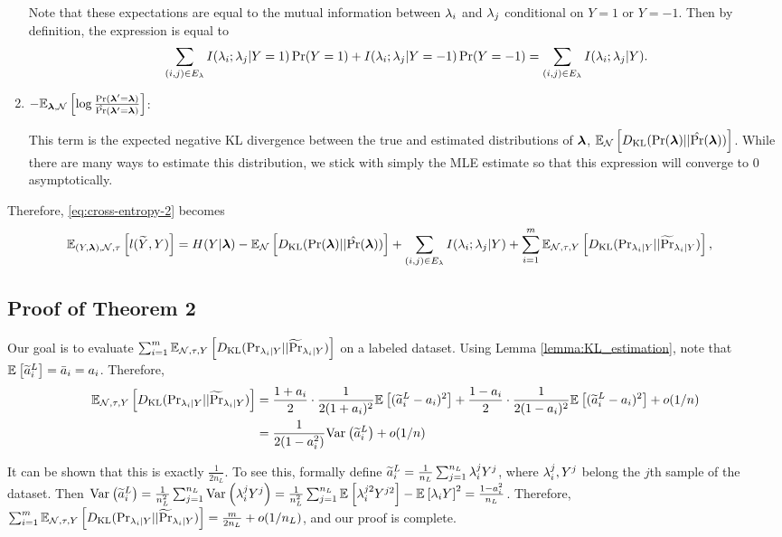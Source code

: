 \begin{enumerate}
    Note that these expectations are equal to the mutual information between $\lambda_i$ and $\lambda_j$ conditional on $Y = 1$ or $Y = -1$. Then by definition, the expression is equal to
    \begin{align*}
    \sum_{(i, j) \in E_{\lambda}} I(\lambda_i; \lambda_j | Y = 1) \Pr(Y = 1) + I(\lambda_i; \lambda_j | Y = -1) \Pr(Y = -1) = \sum_{(i, j) \in E_{\lambda}} I(\lambda_i; \lambda_j | Y).
    \end{align*}


    \item $-\mathbb{E}_{\bm{\lambda}, \mathcal{N}}\left[\log \frac{\Pr(\bm{\lambda}' = \bm{\lambda})}{\hat{\Pr}(\bm{\lambda}' = \bm{\lambda})}\right]$: 
    
    This term is the expected negative KL divergence between the true and estimated distributions of $\bm{\lambda}$, $\mathbb{E}_{\mathcal{N}}\left[D_{\mathrm{KL}}(\Pr(\bm{\lambda}) || \hat{\Pr}(\bm{\lambda}))\right]$. While there are many ways to estimate this distribution, we stick with simply the MLE estimate so that this expression will converge to $0$ asymptotically. 
\end{enumerate}

Therefore, \eqref{eq:cross-entropy-2} becomes
\begin{align}
    \mathbb{E}_{(Y, \bm{\lambda}), \mathcal{N}, \tau}\left[l(\widetilde{Y}, Y)\right] &= H(Y | \bm{\lambda}) - \mathbb{E}_{\mathcal{N}}\left[D_{\mathrm{KL}} (\Pr(\bm{\lambda}) || \hat{\Pr}(\bm{\lambda}))\right] + \sum_{(i, j) \in E_{\lambda}} I(\lambda_i; \lambda_j | Y) + \sum_{i = 1}^m \mathbb{E}_{\mathcal{N}, \tau, Y}\left[D_{\mathrm{KL}} (\mathrm{Pr}_{\lambda_i | Y} || \widetilde{\Pr}_{\lambda_i | Y} )\right], \nonumber 
\end{align}

\subsection{Proof of Theorem 2}

Our goal is to evaluate $\sum_{i = 1}^m \mathbb{E}_{\mathcal{N}, \tau, Y}\left[D_{\mathrm{KL}} (\mathrm{Pr}_{\lambda_i | Y} || \widetilde{\Pr}_{\lambda_i | Y} )\right]$ on a labeled dataset. Using Lemma \ref{lemma:KL_estimation}, note that $\mathbb{E}_{}\left[\widetilde{a}_i^L\right] = \bar{a}_i = a_i$. Therefore,
\begin{align*}
   \mathbb{E}_{\mathcal{N}, \tau, Y}\left[D_{\mathrm{KL}} (\mathrm{Pr}_{\lambda_i | Y} || \widetilde{\Pr}_{\lambda_i | Y} )\right] &= \frac{1 + a_i}{2} \cdot \frac{1}{2(1 + a_i)^2} \mathbb{E}_{}\left[(\widetilde{a}_i^L - a_i)^2\right] + \frac{1 - a_i}{2} \cdot \frac{1}{2(1 - a_i)^2} \mathbb{E}_{}\left[(\widetilde{a}_i^L - a_i)^2\right] + o(1/n) \\
   &=  \frac{1}{2(1 - a_i^2)} \mathrm{Var}_{}\left(\widetilde{a}_i^L\right) + o(1/n)
\end{align*}

It can be shown that this is exactly $\frac{1}{2n_L}$. To see this, formally define $\widetilde{a}_i^L = \frac{1}{n_L} \sum_{j = 1}^{n_L} \lambda_i^j Y^j$, where $\lambda_i^j, Y^j$ belong the $j$th sample of the dataset. Then $
    \mathrm{Var}_{}\left(\widetilde{a}_i^L\right) = \frac{1}{n_L^2} \sum_{j = 1}^{n_L} \mathrm{Var}_{}\left(\lambda_i^j Y^j\right) = \frac{1}{n_L^2} \sum_{j = 1}^{n_L} \mathbb{E}_{}\left[\lambda_i^{j2} Y^{j2}\right] - \mathbb{E}_{}\left[\lambda_i Y\right]^2 = \frac{1 -a_i^2}{n_L}$.
Therefore, $\sum_{i = 1}^m \mathbb{E}_{\mathcal{N}, \tau, Y}\left[D_{\mathrm{KL}} (\mathrm{Pr}_{\lambda_i | Y} || \widetilde{\Pr}_{\lambda_i | Y} )\right] = \frac{m}{2n_L} + o(1/n_L)$, and our proof is complete.

